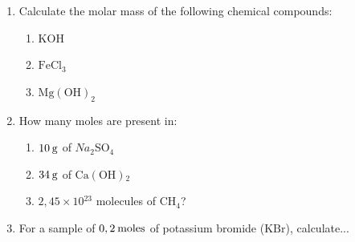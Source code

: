       \label{m38717*id279756}\begin{enumerate}[noitemsep, label=\textbf{\arabic*}. ] 
            \label{m38717*uid47}\item Calculate the molar mass of the following chemical compounds:
\label{m38717*id279772}\begin{enumerate}[noitemsep, label=\textbf{\alph*}. ] 
            \label{m38717*uid48}\item \begin{math}\mathrm{KOH}\end{math}
\label{m38717*uid49}\item \begin{math}\mathrm{FeCl}{}_{3}\end{math}\label{m38717*uid50}\item \begin{math}{\mathrm{Mg\left(OH\right)}}_{2}\end{math}\end{enumerate}
                \label{m38717*uid51}\item How many moles are present in:
\label{m38717*id279848}\begin{enumerate}[noitemsep, label=\textbf{\alph*}. ] 
            \label{m38717*uid52}\item \begin{math}10\phantom{\rule{2pt}{0ex}}\mathrm{g}\end{math} of \begin{math}Na{}_{2}\end{math}SO\begin{math}{}_{4}\end{math}\label{m38717*uid53}\item \begin{math}34\phantom{\rule{2pt}{0ex}}\mathrm{g}\end{math} of \begin{math}\mathrm{Ca\left(OH\right)}{}_{2}\end{math}\label{m38717*uid54}\item \begin{math}2,45\ensuremath{\times}10{}^{23}\end{math} molecules of \begin{math}\mathrm{CH}{}_{4}\end{math}?
\end{enumerate}
                \label{m38717*uid55}\item For a sample of \begin{math}0,2\phantom{\rule{2pt}{0ex}}\mathrm{moles}\end{math} of potassium bromide (\begin{math}\mathrm{KBr}\end{math}), calculate...

\end{enumerate}
